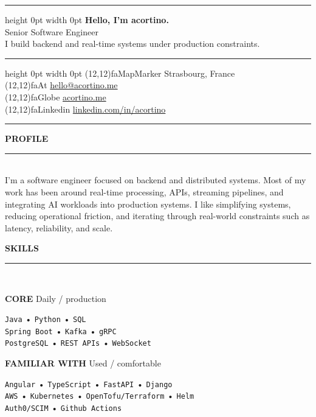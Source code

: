 \documentclass[10pt,a4paper]{article}
\newcommand{\pink}[1]{\textcolor{cvpink}{\textbf{#1}}}
\newcommand{\sectiongap}{\vspace{15pt}}
\newcommand{\cvsect}[1]{%
  {\small\textcolor{cvaccent}{\MakeUppercase{\textbf{#1}}}}\\[-0.2em]
  \textcolor{cvaccent}{\rule{\linewidth}{1pt}}\\[0.4em]
}
\newcommand{\icon}[2]{%
  \colorbox{cvaccent}{\makebox(#2,#2){\textcolor{cvbg}{\large\csname fa#1\endcsname}}}%
}
\newcommand{\icontext}[3]{%
  \icon{#1}{#2}\hspace{0.25cm}\textcolor{cvtext}{#3}%
}
\newcommand{\skillcard}[3]{%
  \begin{tcolorbox}[cvcard]
    {\small\pink{\MakeUppercase{#1}}}%
    \hfill
    {\scriptsize\textcolor{cvaccent}{#2}}%
    \par\vspace{1.8mm}
    {\small #3}
  \end{tcolorbox}%
}
\begin{document}
\small

\begin{minipage}[t]{0.67\textwidth}\hrule height 0pt width 0pt%
    {\Huge\textbf{Hello, I’m \pink{acortino}.}}\\[-0.1em]
    {\Large Senior Software Engineer}\\[0.45em]
    \textcolor{cvmute}{I build backend and real-time systems under production constraints.}
  \end{minipage}%
  \hfill
  \begin{minipage}[t]{0.30\textwidth}\hrule height 0pt width 0pt%
    \small
    \icontext{MapMarker}{12}{Strasbourg, France}\\
    \icontext{At}{12}{\href{mailto:hello@acortino.me}{hello@acortino.me}}\\
    \icontext{Globe}{12}{\href{https://acortino.me}{acortino.me}}\\
    \icontext{Linkedin}{12}{\href{https://linkedin.com/in/acortino}{linkedin.com/in/acortino}}
  \end{minipage}%
  \par\vspace{6pt}
  \textcolor{cvline}{\rule{\linewidth}{1pt}}
  \vspace{6pt}

\cvsect{Profile}
I’m a software engineer focused on backend and distributed systems. Most of my work has been around real-time processing, APIs, streaming pipelines, and integrating AI workloads into production systems. I like simplifying systems, reducing operational friction, and iterating through real-world constraints such as latency, reliability, and scale.

\sectiongap

\cvsect{Skills}
\begin{minipage}[t]{0.48\textwidth}
  \skillcard{Core}{Daily / production}{
 \texttt{Java} • \texttt{Python} • \texttt{SQL} \\[1mm]
  \texttt{Spring Boot} • \texttt{Kafka} • \texttt{gRPC} \\[1mm]
  \texttt{PostgreSQL} • \texttt{REST APIs} • \texttt{WebSocket}
  }
\end{minipage}%
\hfill
\begin{minipage}[t]{0.48\textwidth}
  \skillcard{Familiar with}{Used / comfortable}{
    \texttt{Angular} • \texttt{TypeScript} • \texttt{FastAPI} • \texttt{Django} \\
    \texttt{AWS} • \texttt{Kubernetes} • \texttt{OpenTofu/Terraform} • \texttt{Helm} \\
    \texttt{Auth0/SCIM} • \texttt{Github Actions}
  }
\end{minipage}
\end{document}
